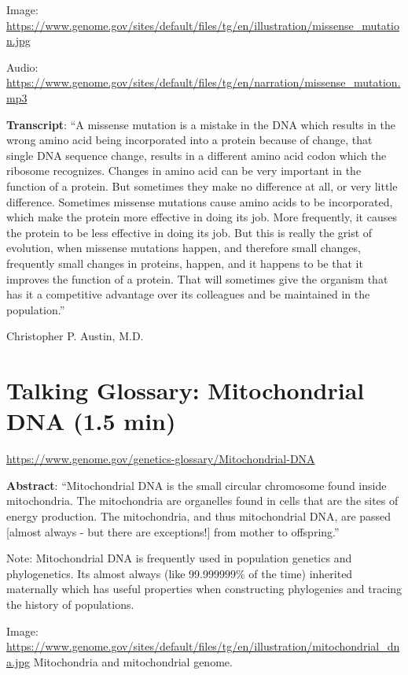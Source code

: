 \documentclass[
]{book}
\begin{document}
Image: \url{https://www.genome.gov/sites/default/files/tg/en/illustration/missense_mutation.jpg}

Audio: \url{https://www.genome.gov/sites/default/files/tg/en/narration/missense_mutation.mp3}

\textbf{Transcript}: ``A missense mutation is a mistake in the DNA which results in the wrong amino acid being incorporated into a protein because of change, that single DNA sequence change, results in a different amino acid codon which the ribosome recognizes. Changes in amino acid can be very important in the function of a protein. But sometimes they make no difference at all, or very little difference. Sometimes missense mutations cause amino acids to be incorporated, which make the protein more effective in doing its job. More frequently, it causes the protein to be less effective in doing its job. But this is really the grist of evolution, when missense mutations happen, and therefore small changes, frequently small changes in proteins, happen, and it happens to be that it improves the function of a protein. That will sometimes give the organism that has it a competitive advantage over its colleagues and be maintained in the population.''

Christopher P. Austin, M.D.

\hypertarget{talking-glossary-mitochondrial-dna-1.5-min}{%
\section{Talking Glossary: Mitochondrial DNA (1.5 min)}\label{talking-glossary-mitochondrial-dna-1.5-min}}

\url{https://www.genome.gov/genetics-glossary/Mitochondrial-DNA}

\textbf{Abstract}: ``Mitochondrial DNA is the small circular chromosome found inside mitochondria. The mitochondria are organelles found in cells that are the sites of energy production. The mitochondria, and thus mitochondrial DNA, are passed {[}almost always - but there are exceptions!{]} from mother to offspring.''

Note: Mitochondrial DNA is frequently used in population genetics and phylogenetics. Its almost always (like 99.999999\% of the time) inherited maternally which has useful properties when constructing phylogenies and tracing the history of populations.

Image: \url{https://www.genome.gov/sites/default/files/tg/en/illustration/mitochondrial_dna.jpg}
Mitochondria and mitochondrial genome.
\end{document}
